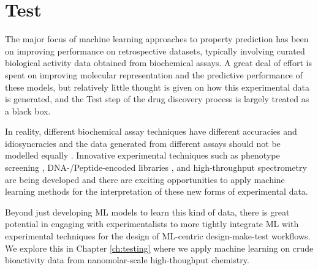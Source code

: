 \section*{Test}
The major focus of machine learning approaches to property prediction has been on improving performance on retrospective datasets, typically involving curated biological activity data obtained from biochemical assays. A great deal of effort is spent on improving molecular representation and the predictive performance of these models, but relatively little thought is given on how this experimental data is generated, and the Test step of the drug discovery process is largely treated as a black box. 

In reality, different biochemical assay techniques have different accuracies and idiosyncracies and the data generated from different assays should not be modelled equally \cite{Hughes2011Principles}. Innovative experimental techniques such as phenotype screening \cite{Chandrasekaran2021Phenotype}, DNA-/Peptide-encoded libraries \cite{GirondaMartinez2021DNALibrary, Rossler2023PeptideLibrary}, and high-throughput spectrometry \cite{Dunas2023MassSpec} are being developed and there are exciting opportunities to apply machine learning methods for the interpretation of these new forms of experimental data.

Beyond just developing ML models to learn this kind of data, there is great potential in engaging with experimentalists to more tightly integrate ML with experimental techniques for the design of ML-centric design-make-test workflows. We explore this in Chapter \ref{ch:testing} where we apply machine learning on crude bioactivity data from nanomolar-scale high-thoughput chemistry.

